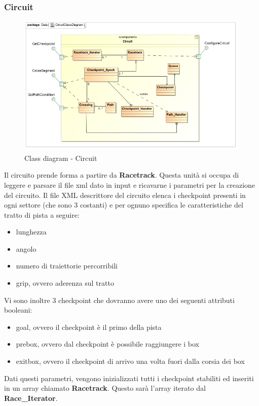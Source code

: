 \subsubsection{Circuit}
\begin{center}
\begin{figure}[h!]
	\includegraphics[scale=0.50]{img/ClassDiagrams/CircuitClassDiagram.jpg}
\caption{Class diagram - Circuit}
\end{figure}
\end{center}
Il circuito prende forma a partire da \textbf{Racetrack}. Questa unit\`{a} si occupa di leggere e parsare il file xml dato in input e ricavarne
i parametri per la creazione del circuito. Il file XML descrittore del circuito elenca i checkpoint presenti in ogni settore (che sono
3 costanti) e per ognuno specifica le caratteristiche del tratto di pista a seguire:
\begin{itemize}
  \item lunghezza
  \item angolo
  \item numero di traiettorie percorribili
  \item grip, ovvero aderenza sul tratto
\end{itemize}
Vi sono inoltre 3 checkpoint che dovranno avere uno dei seguenti attributi booleani:
\begin{itemize}
\item goal, ovvero il checkpoint \`{e} il primo della pista
\item prebox, ovvero dal checkpoint \`{e} possibile raggiungere i box
\item exitbox, ovvero il checkpoint di arrivo una volta fuori dalla corsia dei box
\end{itemize}
Dati questi parametri, vengono inizializzati tutti i checkpoint stabiliti ed inseriti in un array chiamato \textbf{Racetrack}. Questo
sar\`{a} l'array iterato dal \textbf{Race\_Iterator}.\\

